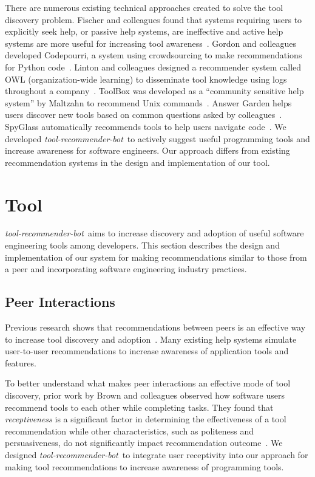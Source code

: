 \documentclass[sigconf,review,anonymous]{acmart}
\newcommand{\tool}{\textsl{tool-recommender-bot}}
\begin{document}
There are numerous existing technical approaches created to solve the tool discovery problem. Fischer and colleagues found that systems requiring users to explicitly seek help, or passive help systems, are ineffective and active help systems are more useful for increasing tool awareness~\cite{Fischer1984ActiveHelpSystems}. Gordon and colleagues developed Codepourri, a system using crowdsourcing to make recommendations for Python code~\cite{Gordon2015Codepourri}. Linton and colleagues designed a recommender system called OWL (organization-wide learning) to disseminate tool knowledge using logs throughout a company~\cite{Linton2000OWL}. ToolBox was developed as a ``community sensitive help system'' by Maltzahn to recommend Unix commands~\cite{Maltzahn1995Toolbox}. Answer Garden helps users discover new tools based on common questions asked by colleagues~\cite{Ackerman1990AnswerGarden}. SpyGlass automatically recommends tools to help users navigate code~\cite{Viriyakattiyaporn2010Spyglass}. We developed \tool~to actively suggest useful programming tools and increase awareness for software engineers. Our approach differs from existing recommendation systems in the design and implementation of our tool.

\section{Tool}
\tool~aims to increase discovery and adoption of useful software engineering tools among developers. This section describes the design and implementation of our system for making recommendations similar to those from a peer and incorporating software engineering industry practices.

\subsection{Peer Interactions}
Previous research shows that recommendations between peers is an effective way to increase tool discovery and adoption~\cite{MurphyHill2011PeerInteraction}. Many existing help systems simulate user-to-user recommendations to increase awareness of application tools and features. 

To better understand what makes peer interactions an effective mode of tool discovery, prior work by Brown and colleagues observed how software users recommend tools to each other while completing tasks. They found that \emph{receptiveness} is a significant factor in determining the effectiveness of a tool recommendation while other characteristics, such as politeness and persuasiveness, do not significantly impact recommendation outcome~\cite{vlhcc17}. We designed \tool~to integrate user receptivity into our approach for making tool recommendations to increase awareness of programming tools.
\end{document}
